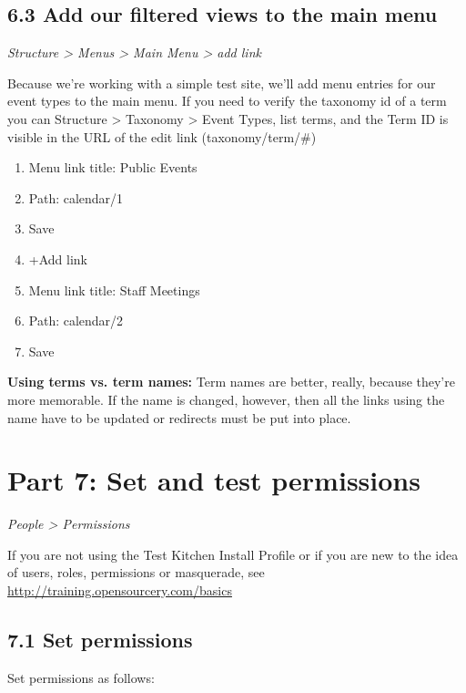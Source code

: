 \documentclass[letterpaper,10pt,english]{sphinxmanual}
\begin{document}
\subsection{6.3 Add our filtered views to the main menu}
\label{event_calendar:add-our-filtered-views-to-the-main-menu}
\emph{Structure \textgreater{} Menus \textgreater{} Main Menu \textgreater{} add link}

Because we're working with a simple test site, we'll add menu entries for our event types to the main menu. If you need to verify the taxonomy id of a term you can Structure \textgreater{} Taxonomy \textgreater{} Event Types, list terms, and the Term ID is visible in the URL of the edit link (taxonomy/term/\#)
\begin{enumerate}
\item {} 
Menu link title: Public Events

\item {} 
Path: calendar/1

\item {} 
Save

\item {} 
+Add link

\item {} 
Menu link title: Staff Meetings

\item {} 
Path: calendar/2

\item {} 
Save

\end{enumerate}

\textbf{Using terms vs. term names:} Term names are better, really, because they're more memorable. If the name is changed, however, then all the links using the name have to be updated or redirects must be put into place.


\section{Part 7: Set and test permissions}
\label{event_calendar:part-7-set-and-test-permissions}
\emph{People \textgreater{} Permissions}

If you are not using the Test Kitchen Install Profile or if you are new to the idea of users, roles, permissions or masquerade, see \href{http://training.opensourcery.com/basics}{http://training.opensourcery.com/basics}


\subsection{7.1 Set permissions}
\label{event_calendar:set-permissions}
Set permissions as follows:
\end{document}
